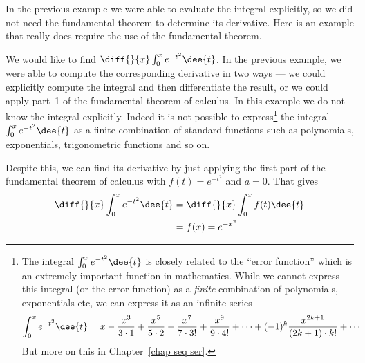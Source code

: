 In the previous example we were able to evaluate the integral explicitly,
so we did not
need the fundamental theorem to determine its derivative. Here is an example that really
does require the use of the fundamental theorem.

\begin{eg}\label{eg:INTftocA}
We would like to find $\diff{}{x}\int_0^x e^{-t^2}\dee{t}$. In the previous
example, we were able to compute the corresponding derivative in two ways --- we could
explicitly compute the integral and then differentiate the result, or we could apply
part~1 of the fundamental theorem
of calculus. In this example we do not know the integral explicitly. Indeed it
is not possible to express\footnote{The integral $\int_0^x e^{-t^2}\dee{t}$ is
closely related to the ``error function'' which is an extremely important
function in mathematics. While we cannot express this integral (or the error
function) as a \emph{finite} combination of polynomials, exponentials etc, we
can express it as an infinite series
\begin{align*}
  \int_0^x e^{-t^2}\dee{t}
  &= x - \frac{x^3}{3\cdot 1} + \frac{x^5}{5\cdot 2} - \frac{x^7}{7\cdot 3!} +
\frac{x^9}{9\cdot 4!} +\cdots + (-1)^k \frac{x^{2k+1}}{(2k+1)\cdot k!} + \cdots
\end{align*}
But more on this in Chapter~\ref{chap seq ser}.} the integral $\int_0^x
e^{-t^2}\dee{t}$ as a finite combination of standard functions such as
polynomials, exponentials, trigonometric functions and so on.


Despite this, we can find its derivative by just applying the first part of
the fundamental theorem of calculus with $f(t)=e^{-t^2}$ and $a=0$.
That gives
\begin{align*}
\diff{}{x}\int_0^x e^{-t^2}\dee{t}
&=\diff{}{x}\int_0^x f(t)\dee{t}\\
&=f(x) = e^{-x^2}
\end{align*}
\end{eg}


